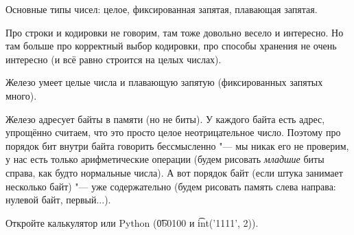 \begin{frame}
	Основные типы чисел: целое, фиксированная запятая, плавающая запятая.

	Про строки и кодировки не говорим, там тоже довольно весело и интересно.
	Но там больше про корректный выбор кодировки, про способы хранения не очень интересно
	(и всё равно строится на целых числах).

	Железо умеет целые числа и плавающую запятую (фиксированных запятых много).

	Железо адресует байты в памяти (но не биты).
	У каждого байта есть адрес, упрощённо считаем, что это просто целое неотрицательное число.
	Поэтому про порядок бит внутри байта говорить бессмысленно "--- мы никак его не проверим, у нас есть только арифметические операции (будем рисовать \textit{младшие} биты справа, как будто нормальные числа).
	А вот порядок байт (если штука занимает несколько байт) "--- уже содержательно (будем рисовать память слева направа: нулевой байт, первый...).

	Откройте калькулятор или Python (\t{0b0100} и \t{int('1111', 2)}).
\end{frame}
